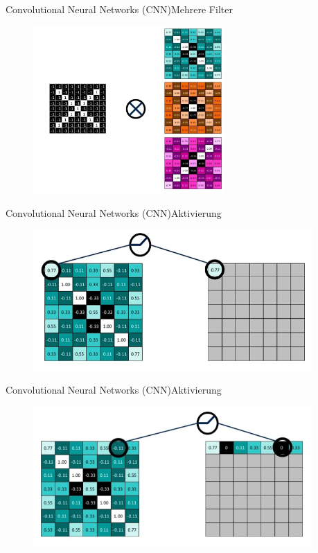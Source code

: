 \documentclass[10pt]{beamer} %
\begin{document}
\begin{frame}{Convolutional Neural Networks (CNN)}{Mehrere Filter}
   \begin{figure}
   \includegraphics[width=0.65\textwidth]{pics/sum_cnn_multipleK.png}
\end{figure}
\end{frame}

\begin{frame}{Convolutional Neural Networks (CNN)}{Aktivierung}
   \begin{figure}
      \includegraphics[width=0.95\textwidth]{pics/relu1.png}
   \end{figure}
\end{frame}

\begin{frame}{Convolutional Neural Networks (CNN)}{Aktivierung}
   \begin{figure}
      \includegraphics[width=0.95\textwidth]{pics/relu2.png}
   \end{figure}
\end{frame}
\end{document}
